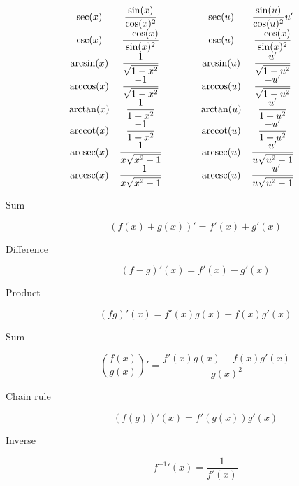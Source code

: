\begin{tcolorbox}[hbox, title=Basic derivatives]
\begin{minipage}{0.7\textwidth}
\[\begin{array}{ccccc}
  \sec(x)      & \dfrac{\sin(x)}{\cos(x)^2}    & \qquad & \sec(u)      & \dfrac{\sin(u)}{\cos(u)^2}u'\\
  \csc(x)      & \dfrac{-\cos(x)}{\sin(x)^2}   & \qquad & \csc(u)      & \dfrac{-\cos(x)}{\sin(x)^2}\\
  \arcsin(x)   & \dfrac{1}{\sqrt{1-x^2}}       & \qquad & \arcsin(u)   & \dfrac{u'}{\sqrt{1-u^2}}\\
  \arccos(x)   & \dfrac{-1}{\sqrt{1-x^2}}      & \qquad & \arccos(u)   & \dfrac{-u'}{\sqrt{1-u^2}}\\
  \arctan(x)   & \dfrac{1}{1+x^2}              & \qquad & \arctan(u)   & \dfrac{u'}{1+u^2}\\
  \operatorname{arccot}(x)   & \dfrac{-1}{1+x^2}             & \qquad & \operatorname{arccot}(u)   & \dfrac{-u'}{1+u^2}\\
  \operatorname{arcsec}(x)   & \dfrac{1}{x\sqrt{x^2-1}}      & \qquad & \operatorname{arcsec}(u)   & \dfrac{u'}{u\sqrt{u^2-1}}\\
  \operatorname{arccsc}(x)   & \dfrac{-1}{x\sqrt{x^2-1}}     & \qquad & \operatorname{arccsc}(u)   & \dfrac{-u'}{u\sqrt{u^2-1}}  
\end{array}
\]
\end{minipage}
\end{tcolorbox}

\begin{tcolorbox}[hbox, title=Derivative rules]
  \begin{minipage}{0.5\textwidth}
    \begin{description}
      \item[Sum]
      \[
        (f(x)+g(x))' = f'(x) + g'(x)
      \]
      \item[Difference]
      \[
        (f-g)'(x) = f'(x) - g'(x)
      \]
      \item[Product]
      \[
        (fg)'(x) = f'(x)g(x) + f(x)g'(x)
      \]
      \item[Sum]
      \[
        \left(\frac{f(x)}{g(x)}\right)' = \frac{f'(x)g(x) - f(x)g'(x)}{g(x)^2}
      \]
      \item[Chain rule]
      \[
        (f(g))'(x) = f'(g(x))g'(x)
      \]
      \item[Inverse]
      \[
        f^{-1}'(x) = \frac{1}{f'(x)}
      \]
    \end{description}
  \end{minipage}
\end{tcolorbox}